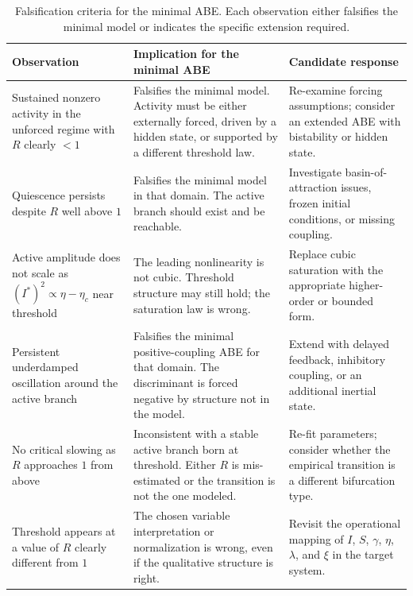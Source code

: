 \documentclass[11pt]{article}
\begin{document}
\begin{table}[p]
\centering
\small
\caption{Falsification criteria for the minimal ABE. Each observation either falsifies the minimal model or indicates the specific extension required.}
\label{tab:falsification}
\begin{tabularx}{\textwidth}{>{\raggedright\arraybackslash}p{} >{\raggedright\arraybackslash}p{} >{\raggedright\arraybackslash}X}
\toprule
\textbf{Observation} & \textbf{Implication for the minimal ABE} & \textbf{Candidate response}\\
\midrule
Sustained nonzero activity in the unforced regime with $R$ clearly $<1$ & Falsifies the minimal model. Activity must be either externally forced, driven by a hidden state, or supported by a different threshold law. & Re-examine forcing assumptions; consider an extended ABE with bistability or hidden state.\\
\addlinespace
Quiescence persists despite $R$ well above $1$ & Falsifies the minimal model in that domain. The active branch should exist and be reachable. & Investigate basin-of-attraction issues, frozen initial conditions, or missing coupling.\\
\addlinespace
Active amplitude does not scale as $(I^*)^2\propto \eta-\eta_c$ near threshold & The leading nonlinearity is not cubic. Threshold structure may still hold; the saturation law is wrong. & Replace cubic saturation with the appropriate higher-order or bounded form.\\
\addlinespace
Persistent underdamped oscillation around the active branch & Falsifies the minimal positive-coupling ABE for that domain. The discriminant is forced negative by structure not in the model. & Extend with delayed feedback, inhibitory coupling, or an additional inertial state.\\
\addlinespace
No critical slowing as $R$ approaches $1$ from above & Inconsistent with a stable active branch born at threshold. Either $R$ is mis-estimated or the transition is not the one modeled. & Re-fit parameters; consider whether the empirical transition is a different bifurcation type.\\
\addlinespace
Threshold appears at a value of $R$ clearly different from $1$ & The chosen variable interpretation or normalization is wrong, even if the qualitative structure is right. & Revisit the operational mapping of $I$, $S$, $\gamma$, $\eta$, $\lambda$, and $\xi$ in the target system.\\
\bottomrule
\end{tabularx}
\end{table}
\end{document}
